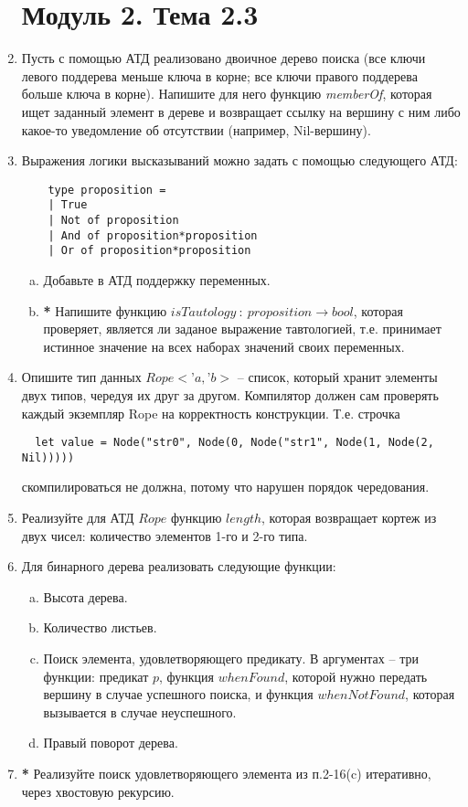 \documentclass[a4paper,11pt]{article}
\begin{document}
\begin{enumerate}[{2-}1]
\section*{Модуль 2. Тема 2.3}

\item Пусть с помощью АТД реализовано двоичное дерево поиска (все ключи левого
  поддерева меньше ключа в корне; все ключи правого поддерева больше ключа
  в корне). Напишите для него функцию \emph{memberOf}, которая ищет заданный
  элемент в дереве и возвращает ссылку на вершину с ним либо какое-то
  уведомление об отсутствии (например, Nil-вершину).
  
\item Выражения логики высказываний можно задать с помощью следующего АТД:
  \begin{lstlisting}
    type proposition =
    | True
    | Not of proposition
    | And of proposition*proposition
    | Or of proposition*proposition
  \end{lstlisting}
  \begin{enumerate}[(a)]
  \item Добавьте в АТД поддержку переменных.
  \item \textbf{*} Напишите функцию 
    $isTautology~:~proposition \rightarrow bool$, которая
    проверяет, является ли заданое выражение тавтологией, т.е. принимает
    истинное значение на всех наборах значений своих переменных.  
  \end{enumerate}

\item Опишите тип данных $Rope<’a, ’b>$ -- список, который хранит элементы 
двух типов, чередуя их друг за другом. Компилятор должен сам проверять каждый
экземпляр Rope на корректность конструкции. Т.е. строчка
\begin{lstlisting}
  let value = Node("str0", Node(0, Node("str1", Node(1, Node(2, Nil)))))
\end{lstlisting}
скомпилироваться не должна, потому что нарушен порядок чередования.

\item Реализуйте для АТД $Rope$ функцию $length$, которая возвращает кортеж
из двух чисел: количество элементов 1-го и 2-го типа.

\item Для бинарного дерева реализовать следующие функции:
  \begin{enumerate}[(a)]
  \item Высота дерева.
  \item Количество листьев.
  \item Поиск элемента, удовлетворяющего предикату. В аргументах – три 
    функции: предикат $p$, функция $whenFound$, которой нужно передать вершину
    в случае успешного поиска, и функция $whenNotFound$, которая вызывается в
    случае неуспешного.
  \item Правый поворот дерева.
  \end{enumerate}

\item \textbf{*} Реализуйте поиск удовлетворяющего элемента из п.2-16(c) 
  итеративно, через хвостовую рекурсию.
\end{enumerate}
\end{document}

